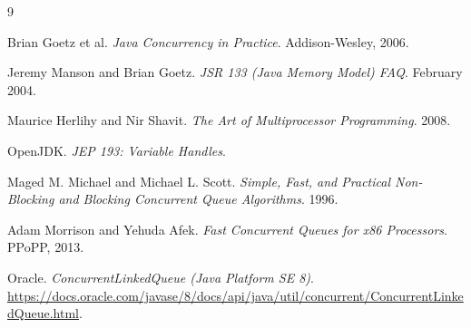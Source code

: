 \begin{thebibliography}{9}

Brian Goetz et al.
\textit{Java Concurrency in Practice}.
Addison-Wesley, 2006.

Jeremy Manson and Brian Goetz.
\textit{JSR 133 (Java Memory Model) FAQ}.
February 2004.

Maurice Herlihy and Nir Shavit.
\textit{The Art of Multiprocessor Programming}.
2008.

OpenJDK.
\textit{JEP 193: Variable Handles}.

Maged M. Michael and Michael L. Scott.
\textit{Simple, Fast, and Practical Non-Blocking and Blocking Concurrent Queue Algorithms}.
1996.

Adam Morrison and Yehuda Afek.
\textit{Fast Concurrent Queues for x86 Processors}.
PPoPP, 2013.

Oracle.
\textit{ConcurrentLinkedQueue (Java Platform SE 8)}.
\url{https://docs.oracle.com/javase/8/docs/api/java/util/concurrent/ConcurrentLinkedQueue.html}.

\end{thebibliography}
